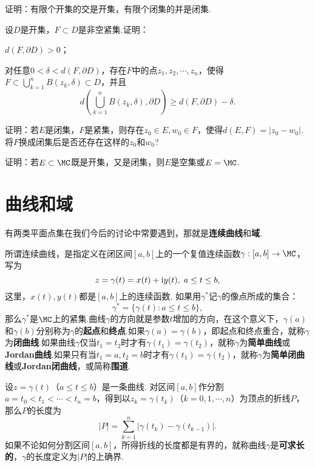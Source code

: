 \begin{xiti}
\item 证明：有限个开集的交是开集，有限个闭集的并是闭集.
\item 设$D$是开集，$F\subset D$是非空紧集.证明：
\begin{enuma}
  \item $d(F,\partial D)>0$；
  \item 对任意$0<\delta<d(F,\partial D)$，存在$F$中的点$z_1,z_2,\cdots,z_n$，使得$F\subset\bigcup_{k=1}^nB(z_k,\delta)\subset D$，并且
  \[d\left(\bigcup_{k=1}^nB(z_k,\delta),\partial D\right)\ge d(F,\partial D)-\delta.\]
\end{enuma}
\item 证明：若$E$是闭集，$F$是紧集，则存在$z_0\in E,w_0\in F$，使得$d(E,F)=|z_0-w_0|$.将$F$换成闭集后是否还存在这样的$z_0$和$w_0$?
\item 证明：若$E\subset \MC$既是开集，又是闭集，则$E$是空集或$E=\MC$.
\end{xiti}

\section{曲线和域\label{sec1.6}}
有两类平面点集在我们今后的讨论中常要遇到，那就是\textbf{连续曲线}和\textbf{域}.

所谓连续曲线，是指定义在闭区间$[a,b]$上的一个复值连续函数$\gamma:[a,b]\to\MC$，写为
\[z=\gamma(t)=x(t)+\textrm  iy(t),\;a\le t\le b,\]
这里，$x(t),y(t)$都是$[a,b]$上的连续函数. 如果用$\gamma^\ast$记$\gamma$的像点所成的集合：
\[\gamma^\ast=\{\gamma(t):a\le t\le b\},\]
那么$\gamma^\ast$是$\MC$上的紧集.曲线$\gamma$的方向就是参数$t$增加的方向，在这个意义下，$\gamma(a)$和$\gamma(b)$分别称为$\gamma$的\textbf{起点}和\textbf{终点}.如果$\gamma(a)=\gamma(b)$，即起点和终点重合，就称$\gamma$为\textbf{闭曲线}.如果曲线$\gamma$仅当$t_1=t_2$时才有$\gamma(t_1)=\gamma(t_2)$，就称$\gamma$为\textbf{简单曲线}或\textbf{Jordan曲线}.如果只有当$t_1=a,t_2=b$时才有$\gamma(t_1)=\gamma(t_2)$，就称$\gamma$为\textbf{简单闭曲线}或\textbf{Jordan闭曲线}，或简称\textbf{围道}.

设$z=\gamma(t)$（$a\le t\le b$）是一条曲线. 对区间$[a,b]$作分割$a=t_0<t_1<\cdots<t_n=b$，得到以$z_k=\gamma(t_k)$（$k=0,1,\cdots,n$）为顶点的折线$P$，那么$P$的长度为
\[|P|=\sum_{k=1}^n|\gamma(t_k)-\gamma(t_{k-1})|.\]
如果不论如何分割区间$[a,b]$，所得折线的长度都是有界的，就称曲线$\gamma$是\textbf{可求长的}，$\gamma$的长度定义为$|P|$的上确界.

